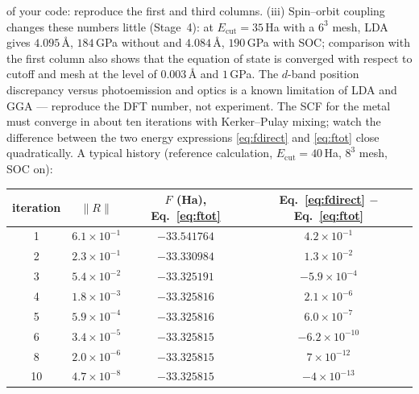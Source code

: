 of your code: reproduce the first and third columns. (iii) Spin--orbit
coupling changes these numbers little (Stage~4): at
$E_{\mathrm{cut}} = 35$\,Ha with a $6^3$ mesh, LDA gives
$4.095$\,\AA, $184$\,GPa without and $4.084$\,\AA, $190$\,GPa with SOC;
comparison with the first column also shows that the equation of state
is converged with respect to cutoff and mesh at the level of
$0.003$\,\AA{} and $1$\,GPa. The $d$-band position discrepancy versus
photoemission and optics is a known limitation of LDA and GGA ---
reproduce the DFT number, not experiment. The SCF for the metal must converge in
about ten iterations with Kerker--Pulay mixing; watch the difference
between the two energy expressions \eqref{eq:fdirect} and \eqref{eq:ftot}
close quadratically. A typical history (reference calculation,
$E_{\mathrm{cut}} = 40$\,Ha, $8^3$ mesh, SOC on):
\begin{center}\small
\begin{tabular}{@{}cccc@{}}
\toprule
iteration & $\|R\|$ & $F$ (Ha), Eq.~\eqref{eq:ftot} & Eq.~\eqref{eq:fdirect} $-$ Eq.~\eqref{eq:ftot}\\
\midrule
1 & $6.1\times10^{-1}$ & $-33.541764$ & $4.2\times10^{-1}$\\
2 & $2.3\times10^{-1}$ & $-33.330984$ & $1.3\times10^{-2}$\\
3 & $5.4\times10^{-2}$ & $-33.325191$ & $-5.9\times10^{-4}$\\
4 & $1.8\times10^{-3}$ & $-33.325816$ & $2.1\times10^{-6}$\\
5 & $5.9\times10^{-4}$ & $-33.325816$ & $6.0\times10^{-7}$\\
6 & $3.4\times10^{-5}$ & $-33.325815$ & $-6.2\times10^{-10}$\\
8 & $2.0\times10^{-6}$ & $-33.325815$ & $7\times10^{-12}$\\
10 & $4.7\times10^{-8}$ & $-33.325815$ & $-4\times10^{-13}$\\
\bottomrule
\end{tabular}
\end{center}

